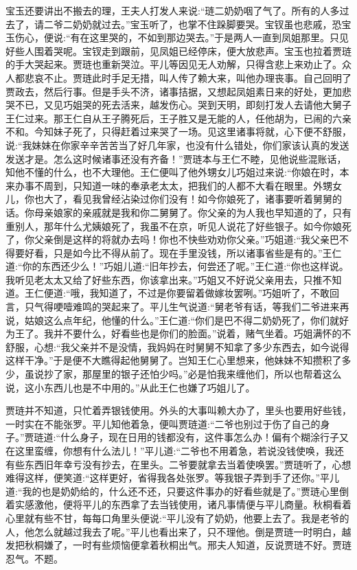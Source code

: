 \begin{parag}
    宝玉还要讲出不搬去的理，王夫人打发人来说:“琏二奶奶咽了气了。所有的人多过去了，请二爷二奶奶就过去。”宝玉听了，也掌不住跺脚要哭。宝钗虽也悲戚，恐宝玉伤心，便说:“有在这里哭的，不如到那边哭去。”于是两人一直到凤姐那里。只见好些人围着哭呢。宝钗走到跟前，见凤姐已经停床，便大放悲声。宝玉也拉着贾琏的手大哭起来。贾琏也重新哭泣。平儿等因见无人劝解，只得含悲上来劝止了。众人都悲哀不止。贾琏此时手足无措，叫人传了赖大来，叫他办理丧事。自己回明了贾政去，然后行事。但是手头不济，诸事拮据，又想起凤姐素日来的好处，更加悲哭不已，又见巧姐哭的死去活来，越发伤心。哭到天明，即刻打发人去请他大舅子王仁过来。那王仁自从王子腾死后，王子胜又是无能的人，任他胡为，已闹的六亲不和。今知妹子死了，只得赶着过来哭了一场。见这里诸事将就，心下便不舒服，说:“我妹妹在你家辛辛苦苦当了好几年家，也没有什么错处，你们家该认真的发送发送才是。怎么这时候诸事还没有齐备！”贾琏本与王仁不睦，见他说些混账话，知他不懂的什么，也不大理他。王仁便叫了他外甥女儿巧姐过来说:“你娘在时，本来办事不周到，只知道一味的奉承老太太，把我们的人都不大看在眼里。外甥女儿，你也大了，看见我曾经沾染过你们没有！如今你娘死了，诸事要听着舅舅的话。你母亲娘家的亲戚就是我和你二舅舅了。你父亲的为人我也早知道的了，只有重别人，那年什么尤姨娘死了，我虽不在京，听见人说花了好些银子。如今你娘死了，你父亲倒是这样的将就办去吗！你也不快些劝劝你父亲。”巧姐道:“我父亲巴不得要好看，只是如今比不得从前了。现在手里没钱，所以诸事省些是有的。”王仁道:“你的东西还少么！”巧姐儿道:“旧年抄去，何尝还了呢。”王仁道:“你也这样说。我听见老太太又给了好些东西，你该拿出来。”巧姐又不好说父亲用去，只推不知道。王仁便道:“哦，我知道了，不过是你要留着做嫁妆罢咧。”巧姐听了，不敢回言，只气得哽噎难鸣的哭起来了。平儿生气说道:“舅老爷有话，等我们二爷进来再说，姑娘这么点年纪，他懂的什么。”王仁道:“你们是巴不得二奶奶死了，你们就好为王了。我并不要什么，好看些也是你们的脸面。”说着，赌气坐着。巧姐满怀的不舒服，心想:“我父亲并不是没情，我妈妈在时舅舅不知拿了多少东西去，如今说得这样干净。”于是便不大瞧得起他舅舅了。岂知王仁心里想来，他妹妹不知攒积了多少，虽说抄了家，那屋里的银子还怕少吗。”必是怕我来缠他们，所以也帮着这么说，这小东西儿也是不中用的。”从此王仁也嫌了巧姐儿了。
\end{parag}


\begin{parag}
    贾琏并不知道，只忙着弄银钱使用。外头的大事叫赖大办了，里头也要用好些钱，一时实在不能张罗。平儿知他着急，便叫贾琏道:“二爷也别过于伤了自己的身子。”贾琏道:“什么身子，现在日用的钱都没有，这件事怎么办！偏有个糊涂行子又在这里蛮缠，你想有什么法儿！”平儿道:“二爷也不用着急，若说没钱使唤，我还有些东西旧年幸亏没有抄去，在里头。二爷要就拿去当着使唤罢。”贾琏听了，心想难得这样，便笑道:“这样更好，省得我各处张罗。等我银子弄到手了还你。”平儿道:“我的也是奶奶给的，什么还不还，只要这件事办的好看些就是了。”贾琏心里倒着实感激他，便将平儿的东西拿了去当钱使用，诸凡事情便与平儿商量。秋桐看着心里就有些不甘，每每口角里头便说:“平儿没有了奶奶，他要上去了。我是老爷的人，他怎么就越过我去了呢。”平儿也看出来了，只不理他。倒是贾琏一时明白，越发把秋桐嫌了，一时有些烦恼便拿着秋桐出气。邢夫人知道，反说贾琏不好。贾琏忍气。不题。
\end{parag}



